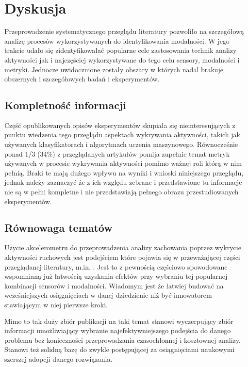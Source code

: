 \pagebreak
\section{Dyskusja}
Przeprowadzenie systematycznego przeglądu literatury pozwoliło na szczegółową analizę procesów wykorzystywanych do identyfikowania modalności. W jego trakcie udało się zidentyfikowałać popularne cele zastosowania technik analizy aktywności jak i najczęściej wykorzystywane do tego celu sensory, modalności i metryki. Jednocze uwidocznione zostały obszary w których nadal brakuje obszernych i szczegółowych badań i eksperymentów.

\subsection{Kompletność informacji}
Część opublikowanych opisów eksperymentów skupiała się nieinteresujących z punktu wiedzenia tego przeglądu aspektach wykrywania aktywności, takich jak używanych klasyfikatorach i algorytmach uczenia maszynowego. Równocześnie ponad 1/3 (34\%) z przeglądanych artykułów pomija zupełnie temat metryk używanych w procesie wykrywania aktywności pomimo ważnej roli którą w nim pełnią. Braki te mają dużego wpływu na wyniki i wnioski niniejszego przeglądu, jednak należy zaznaczyć że z ich względu zebrane i przedstawione tu informacje nie są w pełni kompletne i nie przedstawiają pełnego obrazu przestudiowanych eksperymentów. 

\subsection{Równowaga tematów}
\label{sec:article_balance}
Użycie akcelerometru do przeprowadzenia analizy zachowania poprzez wykrycie aktywności ruchowych jest podejściem które pojawia się w przeważającej części przeglądanej literatury, m.in. \cite{59_Air_Pressure_HAR, 33_Inertial_Study, 29_Daily_Sport_HAR, 30_Context_Awareness, 32_Accel_Phone_HAR, 42_Micro_AR}. Jest to z pewnością częściowo spowodowane wspomnianą już łatwością uzyskania efektów przy wybraniu tej popularnej kombinacji sensorów i modalności. Wiadomym jest że łatwiej budować na wcześniejszych osiągnięciach w danej dziedzienie niż być innowatorem stawiającym w niej pierwsze kroki. 

Mimo to tak duży zbiór publikacji na taki temat stanowi wyczerpujący zbiór informacji umożliwiający wybranie najefektywniejszego podejścia do danego problemu bez konieczności przeprowadzania czasochłonnej i kosztownej analizy. Stanowi też solidną bazę do zwykle postępującej za osiągnięciami naukowymi szerszej adopcji danego rozwiązania.

